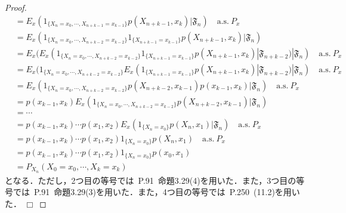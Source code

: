 \documentclass[dvipdfmx]{jsarticle}
\newtheorem{proof}{証明}
\def\qed{\hfill $\Box$}
\begin{document}
\begin{proof}
\begin{align*}
&=E_x(1_{\{X_n=x_0,\cdots,X_{n+k-1}=x_{k-1}\}}p(X_{n+k-1},x_k)|\mathfrak{F}_n) \quad \mathrm{a.s.}{\ }P_x \\
&=E_x(1_{\{X_n=x_0,\cdots,X_{n+k-2}=x_{k-2}\}}1_{\{X_{n+k-1}=x_{k-1}\}}p(X_{n+k-1},x_k)|\mathfrak{F}_n) \\
&=E_x(E_x(1_{\{X_n=x_0,\cdots,X_{n+k-2}=x_{k-2}\}}1_{\{X_{n+k-1}=x_{k-1}\}}p(X_{n+k-1},x_k)|\mathfrak{F}_{n+k-2})|\mathfrak{F}_n) \quad \mathrm{a.s.}{\ }P_x \\
&=E_x(1_{\{X_n=x_0,\cdots,X_{n+k-2}=x_{k-2}\}}E_x(1_{\{X_{n+k-1}=x_{k-1}\}}p(X_{n+k-1},x_k)|\mathfrak{F}_{n+k-2})|\mathfrak{F}_n) \quad \mathrm{a.s.}{\ }P_x \\
&=E_x(1_{\{X_n=x_0,\cdots,X_{n+k-2}=x_{k-2}\}}p(X_{n+k-2},x_{k-1})p(x_{k-1},x_k)|\mathfrak{F}_n) \quad \mathrm{a.s.}{\ }P_x \\
&=p(x_{k-1},x_k)E_x(1_{\{X_n=x_0,\cdots,X_{n+k-2}=x_{k-2}\}}p(X_{n+k-2},x_{k-1})|\mathfrak{F}_n) \\
&=\cdots \\
&=p(x_{k-1},x_k)\cdots p(x_1,x_2)E_x(1_{\{X_n=x_0\}}p(X_n,x_1)|\mathfrak{F}_n) \quad \mathrm{a.s.}{\ }P_x \\
&=p(x_{k-1},x_k)\cdots p(x_1,x_2)1_{\{X_n=x_0\}}p(X_n,x_1) \quad \mathrm{a.s.}{\ }P_x \\
&=p(x_{k-1},x_k)\cdots p(x_1,x_2)1_{\{X_n=x_0\}}p(x_0,x_1) \\
&=P_{X_n}(X_0=x_0,\cdots,X_k=x_k)
\end{align*}
となる．ただし，2つ目の等号では\cite{funaki}{\ }P.91{\ }命題3.29(4)を用いた．また，3つ目の等号では\cite{funaki}{\ }P.91{\ }命題3.29(3)を用いた．また，4つ目の等号では\cite{kotani}{\ }P.250{\ }(11.2)を用いた．
\qed
\end{proof}
%
%
%
%
\end{document}
